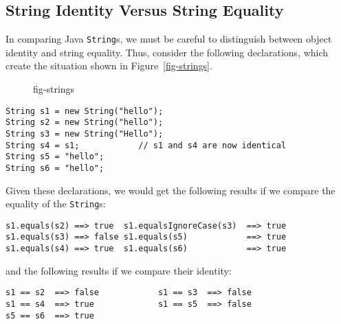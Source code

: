 \subsection{String Identity Versus String Equality}


\noindent In comparing Java {\tt String}s, we must be careful to distinguish
between object identity and string equality.   Thus, consider the
following declarations, which create the situation shown 
in Figure~\ref{fig-strings}.

\begin{figure}[h!]
 {fig-strings}

\end{figure}

\begin{jjjlisting}
\begin{lstlisting}
String s1 = new String("hello");
String s2 = new String("hello");
String s3 = new String("Hello");
String s4 = s1;            // s1 and s4 are now identical
String s5 = "hello";
String s6 = "hello";
\end{lstlisting}
\end{jjjlisting}

\noindent Given these declarations, we would get the
following results if we compare the equality of the {\tt String}s:

\begin{jjjlisting}
\begin{lstlisting}
s1.equals(s2) ==> true  s1.equalsIgnoreCase(s3)  ==> true
s1.equals(s3) ==> false s1.equals(s5)            ==> true
s1.equals(s4) ==> true  s1.equals(s6)            ==> true
\end{lstlisting}
\end{jjjlisting}

\noindent and the following results if we compare their identity:

\begin{jjjlisting}
\begin{lstlisting}
s1 == s2  ==> false            s1 == s3  ==> false
s1 == s4  ==> true             s1 == s5  ==> false
s5 == s6  ==> true
\end{lstlisting}
\end{jjjlisting}

